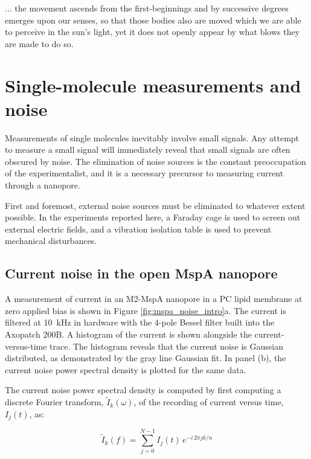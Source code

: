 \begin{savequote}[75mm]
... the movement ascends from the first-beginnings and by successive degrees emerges upon our senses, so that those bodies also are moved which we are able to perceive in the sun's light, yet it does not openly appear by what blows they are made to do so.
\end{savequote}

\chapter{Single-molecule measurements and noise}
\label{thermal_motion}

Measurements of single molecules inevitably involve small signals.  Any attempt to measure a small signal will immediately reveal that small signals are often obscured by noise.  The elimination of noise sources is the constant preoccupation of the experimentalist, and it is a necessary precursor to measuring current through a nanopore.

First and foremost, external noise sources must be eliminated to whatever extent possible.  In the experiments reported here, a Faraday cage is used to screen out external electric fields, and a vibration isolation table is used to prevent mechanical disturbances.

\section{Current noise in the open MspA nanopore}

A measurement of current in an M2-MspA nanopore in a PC lipid membrane at zero applied bias is shown in Figure \ref{fig:mspa_noise_intro}a.  The current is filtered at \SI{10}{\kHz} in hardware with the 4-pole Bessel filter built into the Axopatch 200B.  A histogram of the current is shown alongside the current-versus-time trace.  The histogram reveals that the current noise is Gaussian distributed, as demonstrated by the gray line Gaussian fit.  In panel (b), the current noise power spectral density is plotted for the same data.

The current noise power spectral density is computed by first computing a discrete Fourier transform, $\tilde{I}_k(\omega)$, of the recording of current versus time, $I_j(t)$, as:

\begin{equation}
\tilde{I}_k(f) = \sum_{j=0}^{N-1} I_j(t) \, e^{-i \, 2\pi j k / n}
\label{eqn:dft}
\end{equation}

